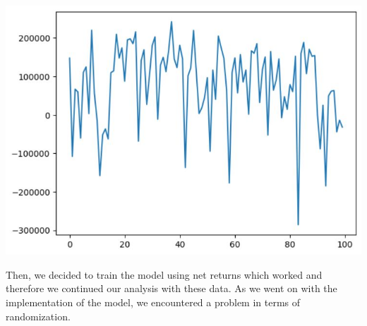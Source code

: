 \documentclass{article}
\begin{document}
\begin{multicols}{2}
    \begin{center}
        \includegraphics[scale = 0.3]{imgs/elisa/price.jpg}
    \end{center}

    Then, we decided to train the model using net returns which worked and therefore we continued our analysis with these data. As we went on with the implementation of the model, we encountered a problem in terms of randomization.\\


\end{multicols}
\end{document}

